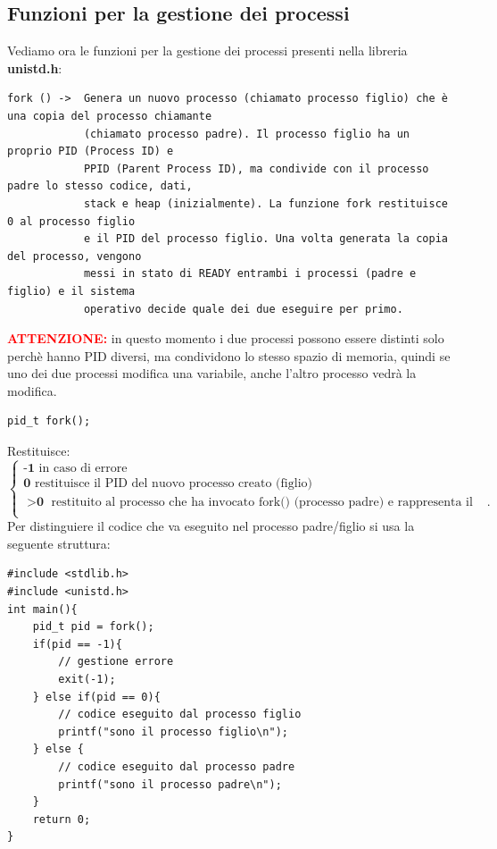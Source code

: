 \subsection{Funzioni per la gestione dei processi}
Vediamo ora le funzioni per la gestione dei processi presenti nella libreria \textbf{unistd.h}:
\begin{verbatim}
fork () ->  Genera un nuovo processo (chiamato processo figlio) che è una copia del processo chiamante 
            (chiamato processo padre). Il processo figlio ha un proprio PID (Process ID) e 
            PPID (Parent Process ID), ma condivide con il processo padre lo stesso codice, dati, 
            stack e heap (inizialmente). La funzione fork restituisce 0 al processo figlio 
            e il PID del processo figlio. Una volta generata la copia del processo, vengono
            messi in stato di READY entrambi i processi (padre e figlio) e il sistema 
            operativo decide quale dei due eseguire per primo.
\end{verbatim}
\textbf{\textcolor{red}{ATTENZIONE:}} in questo momento i due processi possono essere distinti
solo perchè hanno PID diversi, ma condividono lo stesso spazio di memoria, quindi se uno dei 
due processi modifica una variabile, anche l'altro processo vedrà la modifica.
\begin{verbatim}
pid_t fork(); 
\end{verbatim}
Restituisce:
$\begin{cases}
    \textbf{-1}  \text{ in caso di errore} \\
    \textbf{0}  \text{  restituisce il PID del nuovo processo creato (figlio)} \\
    \textbf{$>$0} \text{  restituito al processo che ha invocato fork()
    (processo padre) e rappresenta il PID del processo creato}. \\
\end{cases}$
\medskip\\ \noindent Per distinguiere il codice che va eseguito nel processo padre/figlio si usa la seguente struttura:
\begin{verbatim}
#include <stdlib.h>
#include <unistd.h>
int main(){
    pid_t pid = fork();
    if(pid == -1){
        // gestione errore
        exit(-1);   
    } else if(pid == 0){
        // codice eseguito dal processo figlio
        printf("sono il processo figlio\n");
    } else {
        // codice eseguito dal processo padre
        printf("sono il processo padre\n");
    }
    return 0;
}
\end{verbatim}
